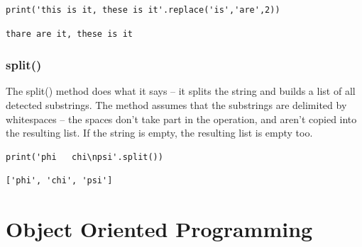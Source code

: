 \documentclass[11pt]{article}
\begin{document}
\begin{verbatim}
print('this is it, these is it'.replace('is','are',2))
\end{verbatim}

\begin{verbatim}
thare are it, these is it
\end{verbatim}

\subsubsection{split()}
\label{sec:org1de1e31}
The split() method does what it says – it splits the string and
builds a list of all detected substrings. The method assumes that
the substrings are delimited by whitespaces – the spaces don’t take
part in the operation, and aren’t copied into the resulting list. If
the string is empty, the resulting list is empty too.

\begin{verbatim}
print('phi   chi\npsi'.split())
\end{verbatim}

\begin{verbatim}
['phi', 'chi', 'psi']
\end{verbatim}

\newpage

\section{Object Oriented Programming}
\label{sec:orgfe88aa1}
\end{document}
